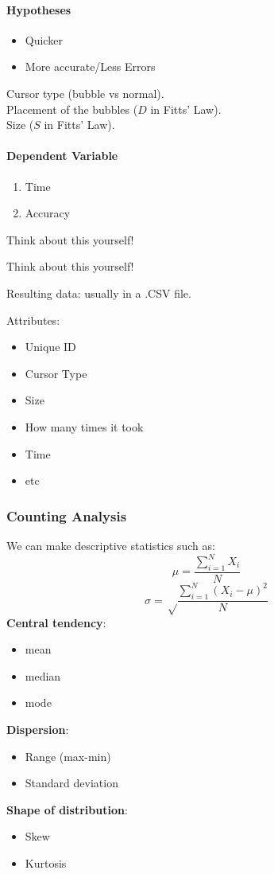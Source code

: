 \paragraph{Hypotheses}
\begin{itemize}
    \item Quicker
    \item More accurate/Less Errors
\end{itemize}
Cursor type (bubble vs normal).\\
Placement of the bubbles ($D$ in Fitts' Law).\\
Size ($S$ in Fitts' Law).

\paragraph{Dependent Variable}
\begin{enumerate}
    \item Time
    \item Accuracy
\end{enumerate}

Think about this yourself!

Think about this yourself!

Resulting data: usually in a .CSV file.

Attributes:
\begin{itemize}
    \item Unique ID
    \item Cursor Type
    \item Size
    \item How many times it took
    \item Time
    \item etc
\end{itemize}

\subsubsection{Counting Analysis}
We can make descriptive statistics such as:
\[
    \mu = \frac{\sum_{i=1}^N X_i}N
\]
\[
    \sigma = \sqrt\frac{\sum_{i=1}^N (X_i-\mu)^2}N
\]
\textbf{Central tendency}:
\begin{itemize}
    \item mean
    \item median
    \item mode
\end{itemize}
\textbf{Dispersion}:
\begin{itemize}
    \item Range (max-min)
    \item Standard deviation
\end{itemize}
\textbf{Shape of distribution}:
\begin{itemize}
    \item Skew
    \item Kurtosis
\end{itemize}

